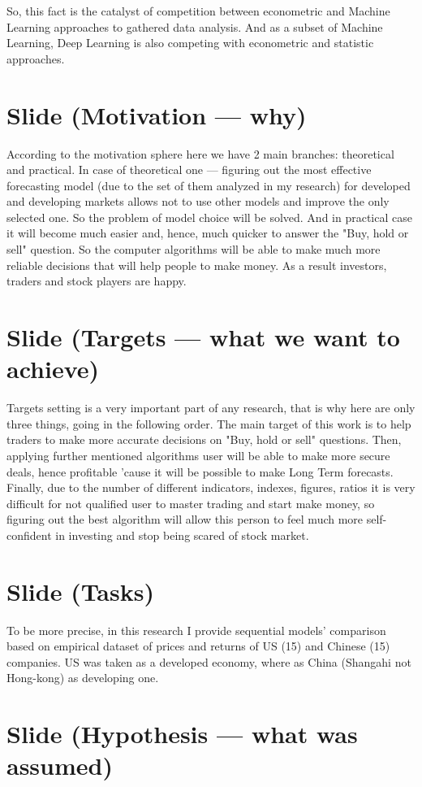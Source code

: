 \documentclass[a4paper, 12pt]{article}
\begin{document}
		So, this fact is the catalyst of competition between econometric and Machine Learning approaches to gathered data analysis. And as a subset of Machine Learning, Deep Learning is also competing with econometric and statistic approaches.
	\section{Slide (Motivation --- why)}
		According to the motivation sphere here we have 2 main branches: theoretical and practical. In case of theoretical one --- figuring out the most effective forecasting model (due to the set of them analyzed in my research) for developed and developing markets allows not to use other models and improve the only selected one. So the problem of model choice will be solved. And in practical case it will become much easier and, hence, much quicker to answer the "Buy, hold or sell" question. So the computer algorithms will be able to make much more reliable decisions that will help people to make money. As a result investors, traders and stock players are happy. 
	\section{Slide (Targets --- what we want to achieve)}
		Targets setting is a very important part of any research, that is why here are only three things, going in the following order. The main target of this work is to help traders to make more accurate decisions on "Buy, hold or sell" questions. Then, applying further mentioned algorithms user will be able to make more secure deals, hence profitable 'cause it will be possible to make Long Term forecasts. Finally, due to the number of different indicators, indexes, figures, ratios it is very difficult for not qualified user to master trading and start make money, so figuring out the best algorithm will allow this person to feel much more self-confident in investing and stop being scared of stock market. 
	\section{Slide (Tasks)}
		To be more precise, in this research I provide sequential models' comparison based on empirical dataset of prices and returns of US (15) and Chinese (15)  companies. US was taken as a developed economy, where as China (Shangahi not Hong-kong) as developing one.
	\section{Slide (Hypothesis --- what was assumed)}
		
\end{document}
